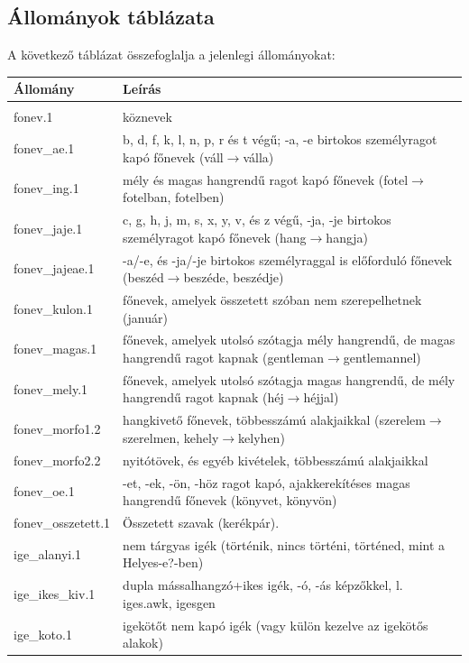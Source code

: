 \subsection{Állományok táblázata}

A következő táblázat összefoglalja a jelenlegi állományokat:

\begin{longtable}[l]{lp{10cm}}
\hline Állomány & Leírás
\\ \hline \endhead
\hline \endfoot
\\ \hline fonev.1 & köznevek
\\ \hline fonev\_ae.1 & b, d, f, k, l, n, p, r és t végű; -a, -e birtokos személyragot kapó főnevek (váll$\rightarrow$válla)
\\ \hline fonev\_ing.1 & mély és magas hangrendű ragot kapó főnevek (fotel$\rightarrow$fotelban, fotelben)
\\ \hline fonev\_jaje.1 & c, g, h, j, m, s, x, y, v, és z végű, -ja, -je birtokos személyragot kapó főnevek (hang$\rightarrow$hangja)
\\ \hline fonev\_jajeae.1 & -a/-e, és -ja/-je birtokos személyraggal is előforduló főnevek (beszéd$\rightarrow$beszéde, beszédje)
\\ \hline fonev\_kulon.1 & főnevek, amelyek összetett szóban nem szerepelhetnek (január)
\\ \hline fonev\_magas.1 & főnevek, amelyek utolsó szótagja mély hangrendű, de magas hangrendű ragot kapnak (gentleman$\rightarrow$gentlemannel)
\\ \hline fonev\_mely.1 & főnevek, amelyek utolsó szótagja magas hangrendű, de mély hangrendű ragot kapnak (héj$\rightarrow$héjjal)
\\ \hline fonev\_morfo1.2 & hangkivető főnevek, többesszámú alakjaikkal (szerelem$\rightarrow$szerelmen, kehely$\rightarrow$kelyhen)
\\ \hline fonev\_morfo2.2 & nyitótövek, és egyéb kivételek, többesszámú alakjaikkal
\\ \hline fonev\_oe.1 & -et, -ek, -ön, -höz ragot kapó, ajakkerekítéses magas hangrendű főnevek (könyvet, könyvön)
\\ \hline fonev\_osszetett.1 & Összetett szavak (kerékpár).
\\ \hline ige\_alanyi.1 & nem tárgyas igék (történik, nincs történi, történed, mint a Helyes-e?-ben)
\\ \hline ige\_ikes\_kiv.1 & dupla mássalhangzó+ikes igék, -ó, -ás képzőkkel, l. iges.awk, igesgen
\\ \hline ige\_koto.1 & igekötőt nem kapó igék (vagy külön kezelve az igekötős alakok)

\end{longtable}
